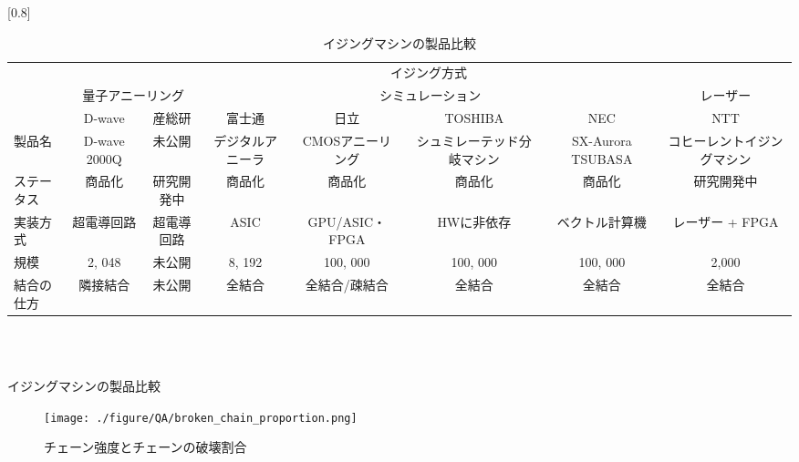 \begin{landscape}
	\begin{table}[hbtp]
		\caption{イジングマシンの製品比較}
		\label{tb:ising_machine}
		\scalebox{0.7}[0.8]{
			\centering
			\begin{tabular}{lccccccc}
				\hline
				&\multicolumn{7}{c}{イジング方式} \\
				&\multicolumn{2}{c}{量子アニーリング} &\multicolumn{4}{c}{シミュレーション} & レーザー\\
				& D-wave & 産総研 & 富士通 & 日立 & TOSHIBA & NEC & NTT \\
				\hline\hline
				製品名 & D-wave 2000Q & 未公開 & デジタルアニーラ & CMOSアニーリング & シュミレーテッド分岐マシン & SX-Aurora TSUBASA & コヒーレントイジングマシン\\
				ステータス & 商品化 & 研究開発中 & 商品化 & 商品化 & 商品化 & 商品化 & 研究開発中\\
				実装方式 & 超電導回路 & 超電導回路 & ASIC & GPU/ASIC・FPGA & HWに非依存 & ベクトル計算機 & レーザー + FPGA\\
				規模 & 2, 048 & 未公開 & 8, 192 & 100, 000 & 100, 000 & 100, 000 & 2,000\\
				結合の仕方 & 隣接結合 & 未公開 & 全結合 & 全結合/疎結合 & 全結合 & 全結合 & 全結合\\
				\hline
			\end{tabular}
		}
	\end{table}
\end{landscape}

\centering
{}
\\
\\

\caption{イジングマシンの製品比較}
\label{tb:ising_machine}

\begin{figure}[H]
	\begin{center}
		\texttt{[image: ./figure/QA/broken\_chain\_proportion.png]}
	\end{center}
	\caption{チェーン強度とチェーンの破壊割合}
	\label{fig:broken}
\end{figure}

